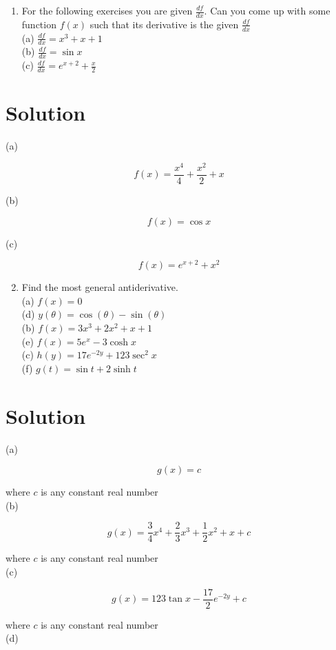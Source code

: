 \documentclass[10pt]{article}
\begin{document}
\begin{enumerate}
  \item For the following exercises you are given $\frac{d f}{d x}$. Can you come up with some function $f(x)$ such that its derivative is the given $\frac{d f}{d x}$\\
(a) $\frac{d f}{d x}=x^{3}+x+1$\\
(b) $\frac{d f}{d x}=\sin x$\\
(c) $\frac{d f}{d x}=e^{x+2}+\frac{x}{2}$
\end{enumerate}

\section*{Solution}
(a)

$$
f(x)=\frac{x^{4}}{4}+\frac{x^{2}}{2}+x
$$

(b)

$$
f(x)=\cos x
$$

(c)

$$
f(x)=e^{x+2}+x^{2}
$$

\begin{enumerate}
  \setcounter{enumi}{1}
  \item Find the most general antiderivative.\\
(a) $f(x)=0$\\
(d) $y(\theta)=\cos (\theta)-\sin (\theta)$\\
(b) $f(x)=3 x^{3}+2 x^{2}+x+1$\\
(e) $f(x)=5 e^{x}-3 \cosh x$\\
(c) $h(y)=17 e^{-2 y}+123 \sec ^{2} x$\\
(f) $g(t)=\sin t+2 \sinh t$
\end{enumerate}

\section*{Solution}
(a)

$$
g(x)=c
$$

where $c$ is any constant real number\\
(b)

$$
g(x)=\frac{3}{4} x^{4}+\frac{2}{3} x^{3}+\frac{1}{2} x^{2}+x+c
$$

where $c$ is any constant real number\\
(c)

$$
g(x)=123 \tan x-\frac{17}{2} e^{-2 y}+c
$$

where $c$ is any constant real number\\
(d)
\end{document}
